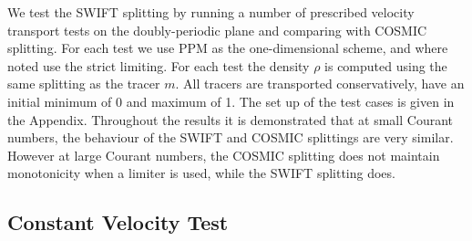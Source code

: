 \documentclass[11pt,a4paper]{article}
\begin{document}
We test the SWIFT splitting by running a number of prescribed velocity transport tests on the doubly-periodic plane and comparing with COSMIC splitting. For each test we use PPM as the one-dimensional scheme, and where noted use the strict limiting. For each test the density $\rho$ is computed using the same splitting as the tracer $m$.
All tracers are transported conservatively, have an initial minimum of 0 and maximum of 1.
The set up of the test cases is given in the Appendix.
Throughout the results it is demonstrated that at small Courant numbers, the behaviour of the SWIFT and COSMIC splittings are very similar. However at large Courant numbers, the COSMIC splitting does not maintain monotonicity when a limiter is used, while the SWIFT splitting does.

\subsection{Constant Velocity Test} \label{sec:test1}
\end{document}
